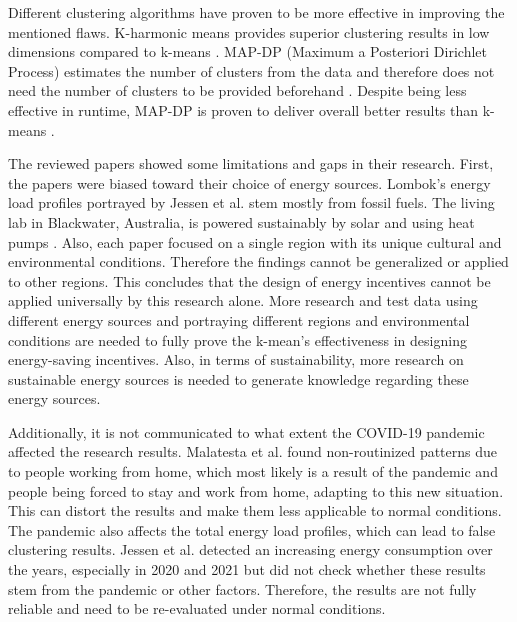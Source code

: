 Different clustering algorithms have proven to be more effective in improving the mentioned flaws.
K-harmonic means provides superior clustering results in low dimensions compared to k-means \cite{HAM-ALT}.
MAP-DP (Maximum a Posteriori Dirichlet Process) estimates the number of clusters from the data and therefore does not need the number of clusters to be provided beforehand \cite{RAY-ALT}.
Despite being less effective in runtime, MAP-DP is proven to deliver overall better results than k-means \cite{RAY-ALT}.

The reviewed papers showed some limitations and gaps in their research.
First, the papers were biased toward their choice of energy sources.
Lombok's energy load profiles portrayed by Jessen et al. \cite{JES-IND} stem mostly from fossil fuels.
The living lab in Blackwater, Australia, is powered sustainably by solar and using heat pumps \cite{MAL-HBP}.
Also, each paper focused on a single region with its unique cultural and environmental conditions.
Therefore the findings cannot be generalized or applied to other regions.
This concludes that the design of energy incentives cannot be applied universally by this research alone.
More research and test data using different energy sources and portraying different regions and environmental conditions are needed to fully prove the k-mean's effectiveness in designing energy-saving incentives. 
Also, in terms of sustainability, more research on sustainable energy sources is needed to generate knowledge regarding these energy sources.

Additionally, it is not communicated to what extent the COVID-19 pandemic affected the research results.
Malatesta et al. \cite{MAL-HBP} found non-routinized patterns due to people working from home, which most likely is a result of the pandemic and people being forced to stay and work from home, adapting to this new situation.
This can distort the results and make them less applicable to normal conditions.
The pandemic also affects the total energy load profiles, which can lead to false clustering results.
Jessen et al. \cite{JES-IND} detected an increasing energy consumption over the years, especially in 2020 and 2021 but did not check whether these results stem from the pandemic or other factors.
Therefore, the results are not fully reliable and need to be re-evaluated under normal conditions.

